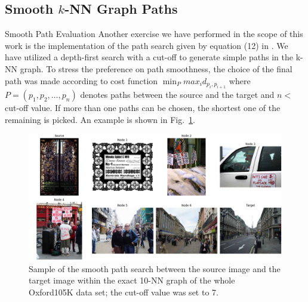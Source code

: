 \subsection{Smooth $k$-NN Graph Paths}


\begin{frame}
\begin{block}{Smooth Path Evaluation}
	Another exercise we have performed in the scope of this work is the implementation of the path search given by equation (12) in \cite{Johnson2017}. We have utilized a depth-first search with a cut-off to generate simple paths in the k-NN graph. To stress the preference on path smoothness, the choice of the final path was made according to cost function $\min_{P} max_{i} d_{p_{i}, p_{i+1}}$ where $P = (p_{1}, p_{2}, \dots, p_{n})$ denotes paths between the source and the target and $n <$ cut-off value. If more than one paths can be chosen, the shortest one of the remaining is picked. An example is shown in Fig.~\ref{fig:smooth_path}.
\end{block}

\end{frame}


\begin{frame}

\begin{figure}
\centering
\includegraphics[width=0.85\linewidth,height=0.65\textheight]{../images/knn/path}
\caption{Sample of the smooth path search between the source image and the target image within the exact 10-NN graph of the whole Oxford105K data set; the cut-off value was set to 7.}
\label{fig:smooth_path}
\end{figure}

\end{frame}